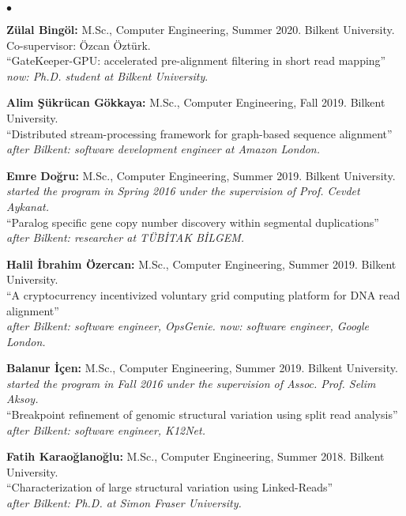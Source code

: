 \documentclass[margin,line]{res}
\newenvironment{list2}{
  \begin{list}{$\bullet$}{%
      \setlength{\itemsep}{0.1cm}
      \setlength{\parsep}{0in} \setlength{\parskip}{0in}
      \setlength{\topsep}{0in} \setlength{\partopsep}{0in} 
      \setlength{\leftmargin}{0.2in}}}{\end{list}}
\begin{document}
\begin{resume}
\begin{list2}
\item
  {\bf Zülal Bingöl:} M.Sc., Computer Engineering, Summer 2020. Bilkent University. Co-supervisor: Özcan Öztürk.\\
  ``GateKeeper-GPU: accelerated pre-alignment filtering in short read mapping''\\
  {\it now: Ph.D. student at Bilkent University}.
\item
  {\bf Alim Şükrücan Gökkaya:} M.Sc., Computer Engineering, Fall 2019.
  Bilkent University. \\
  ``Distributed stream-processing framework for graph-based sequence alignment''\\
  {\it after Bilkent: software development engineer at Amazon London.}
\item
  {\bf Emre Doğru:} M.Sc., Computer Engineering, Summer 2019.
  Bilkent University. {\it started the program in Spring 2016 under the supervision of Prof. Cevdet Aykanat.}\\
  ``Paralog specific gene copy number discovery within segmental duplications''\\
  {\it after Bilkent: researcher at TÜBİTAK BİLGEM.}
\item
  {\bf Halil İbrahim Özercan:} M.Sc., Computer Engineering, Summer 2019.
  Bilkent University. \\
  ``A cryptocurrency incentivized voluntary grid computing platform for DNA read alignment''\\
  {\it after Bilkent: software engineer, OpsGenie. now: software engineer, Google London.}
\item
  {\bf Balanur İçen:} M.Sc., Computer Engineering, Summer 2019.
  Bilkent University. {\it started the program in Fall 2016 under the supervision of Assoc. Prof. Selim Aksoy.}\\
  ``Breakpoint refinement of genomic structural variation using split read analysis'' \\
  {\it after Bilkent: software engineer, K12Net.}
\item
  {\bf Fatih Karaoğlanoğlu:} M.Sc., Computer Engineering, Summer 2018.
  Bilkent University. \\
  ``Characterization of large structural variation using Linked-Reads''\\
  {\it after Bilkent: Ph.D. at Simon Fraser University.}
  
\clearpage


\end{list2}
\end{resume}
\end{document}
